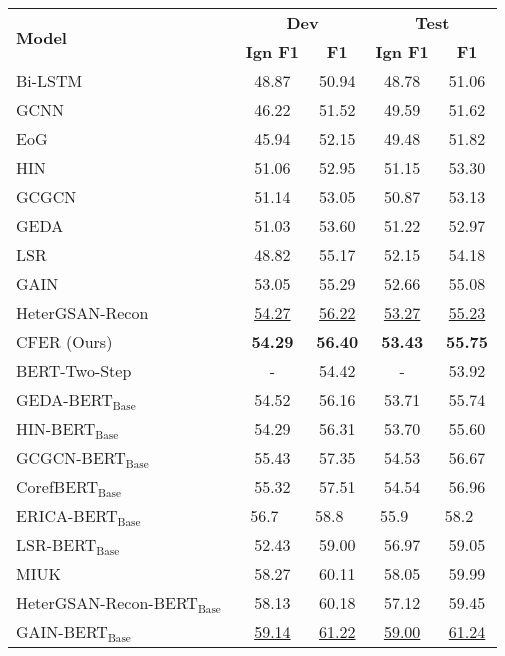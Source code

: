 \documentclass{article}
\newcommand{\citep}{\cite}
\begin{document}
\begin{table*}[t]
\centering
\setlength{\tabcolsep}{15pt}
\begin{tabular}{l | c c | c c}
\toprule
\multirow{2}{*}{\textbf{Model}} & \multicolumn{2}{c|}{\textbf{Dev}} & \multicolumn{2}{c}{\textbf{Test}} \\ 
& \textbf{Ign F1} & \textbf{F1} & \textbf{Ign F1} & \textbf{F1}  \\ 
\midrule
\midrule
Bi-LSTM~\citep{docred} & 48.87 & 50.94 & 48.78 & 51.06 \\
GCNN~\citep{gcnn} & 46.22 & 51.52 & 49.59 & 51.62 \\
EoG~\citep{eog} & 45.94 & 52.15 & 49.48 & 51.82 \\
HIN~\citep{hin} & 51.06 & 52.95 & 51.15 & 53.30 \\
GCGCN~\citep{gcgcn} & 51.14 & 53.05 & 50.87 & 53.13 \\
GEDA~\citep{geda} & 51.03 & 53.60 & 51.22 & 52.97 \\
LSR~\citep{lsr} & 48.82 & 55.17 & 52.15 & 54.18 \\
GAIN~\citep{gain} & 53.05 & 55.29 & 52.66 & 55.08 \\
HeterGSAN-Recon~\citep{recon} & \underline{54.27} & \underline{56.22} & \underline{53.27} & \underline{55.23} \\
CFER (Ours) & \textbf{54.29} & \textbf{56.40} & \textbf{53.43} & \textbf{55.75} \\
\midrule
BERT-Two-Step~\citep{bert_two_step} & - & 54.42 & - & 53.92 \\
GEDA-BERT$_{\text{Base}}$~\citep{geda} & 54.52 & 56.16 & 53.71 & 55.74 \\
HIN-BERT$_{\text{Base}}$~\citep{hin} & 54.29 & 56.31 & 53.70 & 55.60 \\
GCGCN-BERT$_{\text{Base}}$~\citep{gcgcn} & 55.43 & 57.35 & 54.53 & 56.67 \\
CorefBERT$_{\text{Base}}$~\citep{coref_bert} & 55.32 & 57.51 & 54.54 & 56.96 \\
ERICA-BERT$_{\text{Base}}$~\citep{erica} & 56.7~~ & 58.8~~ & 55.9~~ & 58.2~~ \\
LSR-BERT$_{\text{Base}}$~\citep{lsr} & 52.43 & 59.00 & 56.97 & 59.05 \\
MIUK~\citep{miuk} & 58.27 & 60.11 & 58.05 & 59.99 \\
HeterGSAN-Recon-BERT$_{\text{Base}}$~\citep{recon} & 58.13 & 60.18 & 57.12 & 59.45 \\
GAIN-BERT$_{\text{Base}}$~\citep{gain} & \underline{59.14} & \underline{61.22} & \underline{59.00} & \underline{61.24} \\

\end{tabular}
\end{table*}
\end{document}
